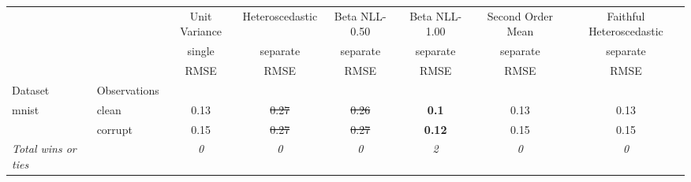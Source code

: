 \begin{tabular}{ll|c|c|c|c|c|c}
\toprule
{} & {} & {Unit Variance} & {Heteroscedastic} & {Beta NLL-0.50} & {Beta NLL-1.00} & {Second Order Mean} & {Faithful Heteroscedastic} \\
{} & {} & {single} & {separate} & {separate} & {separate} & {separate} & {separate} \\
{} & {} & {RMSE} & {RMSE} & {RMSE} & {RMSE} & {RMSE} & {RMSE} \\
{Dataset} & {Observations} & {} & {} & {} & {} & {} & {} \\
\midrule
\multirow[t]{2}{*}{mnist} & clean & 0.13 & \sout{0.27} & \sout{0.26} & \textbf{0.1} & 0.13 & 0.13 \\
 & corrupt & 0.15 & \sout{0.27} & \sout{0.27} & \textbf{0.12} & 0.15 & 0.15 \\
\textit{{Total wins or ties}} &  & \textit{0} & \textit{0} & \textit{0} & \textit{2} & \textit{0} & \textit{0} \\
\bottomrule
\end{tabular}
